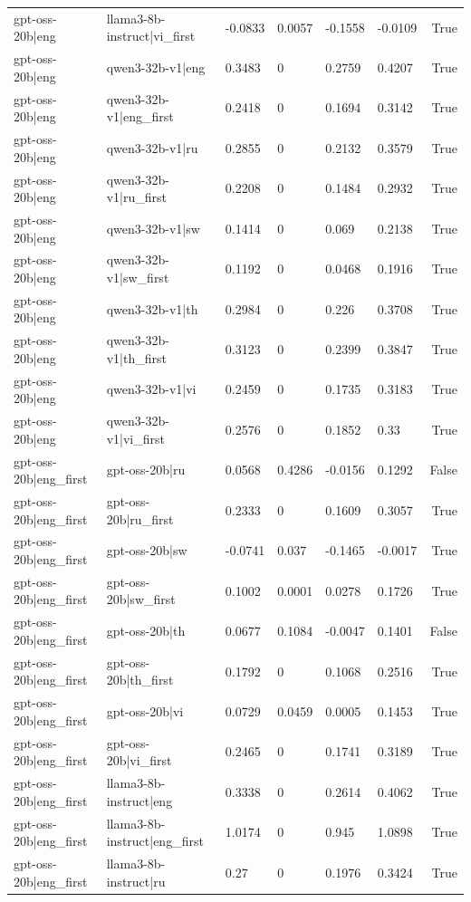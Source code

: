 \begin{table}
\begin{tabular}{llllllr}
gpt-oss-20b|eng & llama3-8b-instruct|vi_first & -0.0833 & 0.0057 & -0.1558 & -0.0109 & True \\
gpt-oss-20b|eng & qwen3-32b-v1|eng & 0.3483 & 0 & 0.2759 & 0.4207 & True \\
gpt-oss-20b|eng & qwen3-32b-v1|eng_first & 0.2418 & 0 & 0.1694 & 0.3142 & True \\
gpt-oss-20b|eng & qwen3-32b-v1|ru & 0.2855 & 0 & 0.2132 & 0.3579 & True \\
gpt-oss-20b|eng & qwen3-32b-v1|ru_first & 0.2208 & 0 & 0.1484 & 0.2932 & True \\
gpt-oss-20b|eng & qwen3-32b-v1|sw & 0.1414 & 0 & 0.069 & 0.2138 & True \\
gpt-oss-20b|eng & qwen3-32b-v1|sw_first & 0.1192 & 0 & 0.0468 & 0.1916 & True \\
gpt-oss-20b|eng & qwen3-32b-v1|th & 0.2984 & 0 & 0.226 & 0.3708 & True \\
gpt-oss-20b|eng & qwen3-32b-v1|th_first & 0.3123 & 0 & 0.2399 & 0.3847 & True \\
gpt-oss-20b|eng & qwen3-32b-v1|vi & 0.2459 & 0 & 0.1735 & 0.3183 & True \\
gpt-oss-20b|eng & qwen3-32b-v1|vi_first & 0.2576 & 0 & 0.1852 & 0.33 & True \\
gpt-oss-20b|eng_first & gpt-oss-20b|ru & 0.0568 & 0.4286 & -0.0156 & 0.1292 & False \\
gpt-oss-20b|eng_first & gpt-oss-20b|ru_first & 0.2333 & 0 & 0.1609 & 0.3057 & True \\
gpt-oss-20b|eng_first & gpt-oss-20b|sw & -0.0741 & 0.037 & -0.1465 & -0.0017 & True \\
gpt-oss-20b|eng_first & gpt-oss-20b|sw_first & 0.1002 & 0.0001 & 0.0278 & 0.1726 & True \\
gpt-oss-20b|eng_first & gpt-oss-20b|th & 0.0677 & 0.1084 & -0.0047 & 0.1401 & False \\
gpt-oss-20b|eng_first & gpt-oss-20b|th_first & 0.1792 & 0 & 0.1068 & 0.2516 & True \\
gpt-oss-20b|eng_first & gpt-oss-20b|vi & 0.0729 & 0.0459 & 0.0005 & 0.1453 & True \\
gpt-oss-20b|eng_first & gpt-oss-20b|vi_first & 0.2465 & 0 & 0.1741 & 0.3189 & True \\
gpt-oss-20b|eng_first & llama3-8b-instruct|eng & 0.3338 & 0 & 0.2614 & 0.4062 & True \\
gpt-oss-20b|eng_first & llama3-8b-instruct|eng_first & 1.0174 & 0 & 0.945 & 1.0898 & True \\
gpt-oss-20b|eng_first & llama3-8b-instruct|ru & 0.27 & 0 & 0.1976 & 0.3424 & True \\

\end{tabular}
\end{table}
